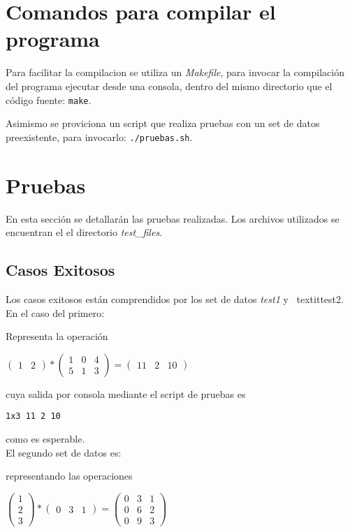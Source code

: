 \documentclass[10pt,a4paper]{article}
\begin{document}
\section{Comandos para compilar el programa}
Para facilitar la compilacion se utiliza un \textit{Makefile}, para invocar la compilación del programa ejecutar desde una consola, dentro del mismo directorio que el código fuente: \texttt{make}.

Asimismo se proviciona un script que realiza pruebas con un set de datos preexistente, para invocarlo: \texttt{./pruebas.sh}.

\section{Pruebas}
	En esta sección se detallarán las pruebas realizadas. Los archivos utilizados se encuentran el el directorio \textit{test\_files}.
	\subsection{Casos Exitosos}
		Los casos exitosos están comprendidos por los set de datos \textit{test1} y \	textit{test2}.	
		En el caso del	 primero:\	
	
		
	
		Representa la operación
		\begin{center}
		$\begin{pmatrix}
		1 & 2
		\end{pmatrix}
		*
		\begin{pmatrix}
		1 & 0 & 4 \\ 5 & 1 & 3
		\end{pmatrix}
		=
		\begin{pmatrix}
		11 & 2 & 10
		\end{pmatrix}
		$
		\end{center}
	
		cuya salida por consola mediante el script de pruebas es
	
		\texttt{1x3 11 2 10 }
	
		como es esperable.\\
	
		El segundo set de datos es:
		
	
		representando las operaciones
	
		\begin{center}
		$\begin{pmatrix}
		1 \\ 2 \\ 3
		\end{pmatrix}
		*
		\begin{pmatrix}
		0 & 3 & 1
		\end{pmatrix}
		=
		\begin{pmatrix}
		0 & 3 & 1 \\ 0 & 6 & 2 \\ 0 & 9 & 3
		\end{pmatrix}
		$\end{center}
	
\end{document}

